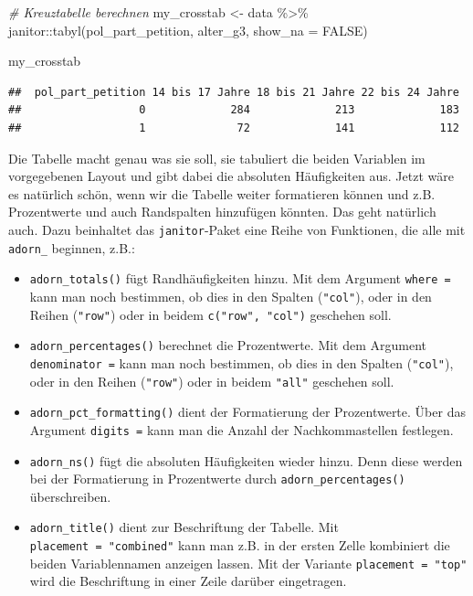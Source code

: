 \documentclass[
]{book}
\newenvironment{Shaded}{\begin{snugshade}}{\end{snugshade}}
\newcommand{\AttributeTok}[1]{\textcolor[rgb]{0.77,0.63,0.00}{#1}}
\newcommand{\CommentTok}[1]{\textcolor[rgb]{0.56,0.35,0.01}{\textit{#1}}}
\newcommand{\ConstantTok}[1]{\textcolor[rgb]{0.00,0.00,0.00}{#1}}
\newcommand{\FunctionTok}[1]{\textcolor[rgb]{0.00,0.00,0.00}{#1}}
\newcommand{\NormalTok}[1]{#1}
\newcommand{\OtherTok}[1]{\textcolor[rgb]{0.56,0.35,0.01}{#1}}
\newcommand{\SpecialCharTok}[1]{\textcolor[rgb]{0.00,0.00,0.00}{#1}}
\begin{document}
\begin{Shaded}
\begin{Highlighting}[]
\CommentTok{\# Kreuztabelle berechnen}
\NormalTok{my\_crosstab }\OtherTok{\textless{}{-}}\NormalTok{ data }\SpecialCharTok{\%\textgreater{}\%}
\NormalTok{  janitor}\SpecialCharTok{::}\FunctionTok{tabyl}\NormalTok{(pol\_part\_petition, alter\_g3, }\AttributeTok{show\_na =} \ConstantTok{FALSE}\NormalTok{) }

\NormalTok{my\_crosstab}
\end{Highlighting}
\end{Shaded}

\begin{verbatim}
##  pol_part_petition 14 bis 17 Jahre 18 bis 21 Jahre 22 bis 24 Jahre
##                  0             284             213             183
##                  1              72             141             112
\end{verbatim}

Die Tabelle macht genau was sie soll, sie tabuliert die beiden Variablen im vorgegebenen Layout und gibt dabei die absoluten Häufigkeiten aus. Jetzt wäre es natürlich schön, wenn wir die Tabelle weiter formatieren können und z.B. Prozentwerte und auch Randspalten hinzufügen könnten. Das geht natürlich auch. Dazu beinhaltet das \texttt{janitor}-Paket eine Reihe von Funktionen, die alle mit \texttt{adorn\_} beginnen, z.B.:

\begin{itemize}
\item
  \texttt{adorn\_totals()} fügt Randhäufigkeiten hinzu. Mit dem Argument \texttt{where\ =} kann man noch bestimmen, ob dies in den Spalten (\texttt{"col"}), oder in den Reihen (\texttt{"row"}) oder in beidem \texttt{c("row",\ "col")} geschehen soll.
\item
  \texttt{adorn\_percentages()} berechnet die Prozentwerte. Mit dem Argument \texttt{denominator\ =} kann man noch bestimmen, ob dies in den Spalten (\texttt{"col"}), oder in den Reihen (\texttt{"row"}) oder in beidem \texttt{"all"} geschehen soll.
\item
  \texttt{adorn\_pct\_formatting()} dient der Formatierung der Prozentwerte. Über das Argument \texttt{digits\ =} kann man die Anzahl der Nachkommastellen festlegen.
\item
  \texttt{adorn\_ns()} fügt die absoluten Häufigkeiten wieder hinzu. Denn diese werden bei der Formatierung in Prozentwerte durch \texttt{adorn\_percentages()} überschreiben.
\item
  \texttt{adorn\_title()} dient zur Beschriftung der Tabelle. Mit \texttt{placement\ =\ "combined"} kann man z.B. in der ersten Zelle kombiniert die beiden Variablennamen anzeigen lassen. Mit der Variante \texttt{placement\ =\ "top"} wird die Beschriftung in einer Zeile darüber eingetragen.
\end{itemize}
\end{document}
